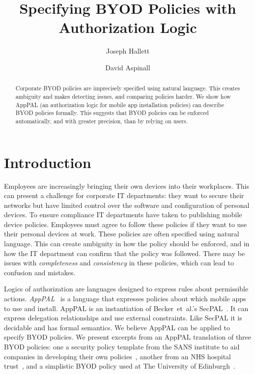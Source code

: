 \documentclass{easychair}
\title{Specifying BYOD Policies with Authorization Logic}
\author{
  Joseph Hallett\inst{1}
  \and
  David Aspinall\inst{1}
}
\institute{
  University of Edinburgh
}
\begin{document}
\maketitle

\begin{abstract}
  Corporate BYOD policies are imprecisely specified using natural language.
  This creates ambiguity and makes detecting issues, and comparing policies harder.
  We show how AppPAL (an authorization logic for mobile app installation policies) can describe BYOD policies formally.
  This suggests that BYOD policies can be enforced automatically, and with greater precision, than by relying on users.
\end{abstract}

\section{Introduction}

Employees are increasingly bringing their own devices into their workplaces.
This can present a challenge for corporate IT departments:
  they want to secure their networks but have limited control over the software and configuration of personal devices.
To ensure compliance IT departments have taken to publishing mobile device policies.
Employees must agree to follow these policies if they want to use their personal devices at work.
These policies are often specified using natural language.
This can create ambiguity in how the policy should be enforced, and in how the IT department can confirm that the policy was followed.
There may be issues with \emph{completeness} and \emph{consistency} in these policies, which can lead to confusion and mistakes.

Logics of authorization are languages designed to express rules about permissible actions.
\emph{AppPAL}~\cite{Hallett:2016vu} is a language that expresses policies about which mobile apps to use and install.
AppPAL is an instantiation of Becker~et~al{.}'s SecPAL~\cite{Becker:2006vh}.
It can express delegation relationships and use external constraints.
Like SecPAL it is decidable and has formal semantics.
We believe AppPAL can be applied to specify BYOD policies. 
We present excerpts from an AppPAL translation of three BYOD policies: 
    one a security policy template from the SANS institute to aid companies in developing their own policies~\cite{Guerin:2008we}, 
    another from an NHS hospital trust~\cite{Kennington:2014tr},
    and a simplistic BYOD policy used at The University of Edinburgh~\cite{Williamson:2015tr}.
\end{document}
